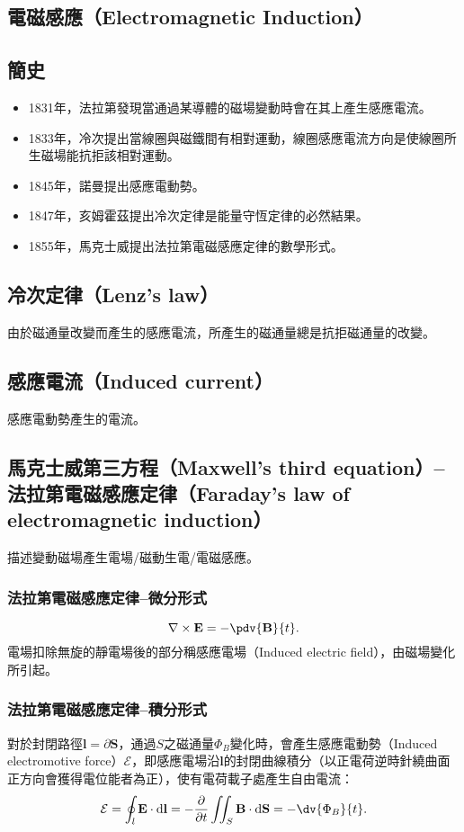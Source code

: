 \documentclass[a4paper,12pt]{report}
\begin{document}
\begin{itemize}
\section{電磁感應（Electromagnetic Induction）}
\subsection{簡史}
\begin{itemize}
\item 1831年，法拉第發現當通過某導體的磁場變動時會在其上產生感應電流。
\item 1833年，冷次提出當線圈與磁鐵間有相對運動，線圈感應電流方向是使線圈所生磁場能抗拒該相對運動。
\item 1845年，諾曼提出感應電動勢。
\item 1847年，亥姆霍茲提出冷次定律是能量守恆定律的必然結果。
\item 1855年，馬克士威提出法拉第電磁感應定律的數學形式。
\end{itemize}
\subsection{冷次定律（Lenz's law）}
由於磁通量改變而產生的感應電流，所產生的磁通量總是抗拒磁通量的改變。
\subsection{感應電流（Induced current）}
感應電動勢產生的電流。
\subsection{馬克士威第三方程（Maxwell's third equation）–法拉第電磁感應定律（Faraday's law of electromagnetic induction）}
描述變動磁場產生電場/磁動生電/電磁感應。
\subsubsection{法拉第電磁感應定律–微分形式}
\[\nabla \times \mathbf{E} = -\pdv{\mathbf{B}}{t}.\]
電場扣除無旋的靜電場後的部分稱感應電場（Induced electric field），由磁場變化所引起。
\subsubsection{法拉第電磁感應定律–積分形式}
對於封閉路徑$\mathbf{l}=\partial\mathbf{S}$，通過$S$之磁通量$\Phi_B$變化時，會產生感應電動勢（Induced electromotive force）$\mathcal{E}$，即感應電場沿$\mathbf{l}$的封閉曲線積分（以正電荷逆時針繞曲面正方向會獲得電位能者為正），使有電荷載子處產生自由電流：
\[\mathcal{E}=\oint_{l}\mathbf{E}\cdot\mathrm{d}\mathbf{l}=-\frac{\partial}{\partial t}\iint_S\mathbf{B}\cdot\mathrm{d}\mathbf{S}=-\dv{\Phi_B}{t}.\]

\end{itemize}
\end{document}

